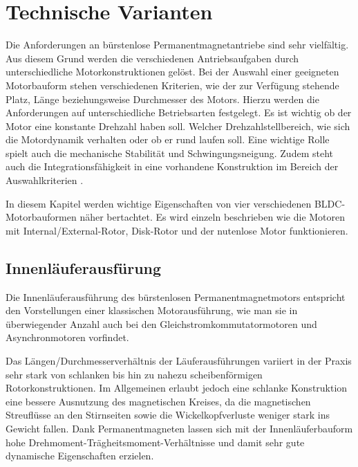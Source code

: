 \section{Technische Varianten}

Die Anforderungen an bürstenlose Permanentmagnetantriebe sind sehr vielfältig. Aus diesem Grund werden die verschiedenen Antriebsaufgaben durch unterschiedliche Motorkonstruktionen gelöst. Bei der Auswahl einer geeigneten Motorbauform stehen verschiedenen Kriterien, wie der zur Verfügung stehende Platz, Länge beziehungsweise Durchmesser des Motors. Hierzu werden die Anforderungen auf unterschiedliche Betriebsarten festgelegt. Es ist wichtig ob der Motor eine konstante Drehzahl haben soll. Welcher Drehzahlstellbereich, wie sich die Motordynamik verhalten oder ob er rund laufen soll. Eine wichtige Rolle spielt auch die mechanische Stabilität und Schwingungsneigung. Zudem steht auch die Integrationsfähigkeit in eine vorhandene Konstruktion im Bereich der Auswahlkriterien \parencite[S.74]{Stölting2011}.

In diesem Kapitel werden wichtige Eigenschaften von vier verschiedenen BLDC-Motorbauformen näher bertachtet. Es wird einzeln beschrieben wie die Motoren mit Internal/External-Rotor, Disk-Rotor und der nutenlose Motor funktionieren.

\subsection{Innenläuferausfürung}
Die Innenläuferausführung des bürstenlosen Permanentmagnetmotors entspricht den Vorstellungen einer klassischen Motorausführung, wie man sie in überwiegender Anzahl auch bei den Gleichstromkommutatormotoren und Asynchronmotoren vorfindet.

Das Längen/Durchmesserverhältnis der Läuferausführungen variiert in der Praxis sehr stark von schlanken bis hin zu nahezu scheibenförmigen Rotorkonstruktionen. Im Allgemeinen erlaubt jedoch eine schlanke Konstruktion eine bessere Ausnutzung des magnetischen Kreises, da die magnetischen Streuflüsse an den Stirnseiten sowie die Wickelkopfverluste weniger stark ins Gewicht fallen. Dank Permanentmagneten lassen sich mit der Innenläuferbauform hohe Drehmoment-Trägheitsmoment-Verhältnisse und damit sehr gute dynamische Eigenschaften erzielen.

